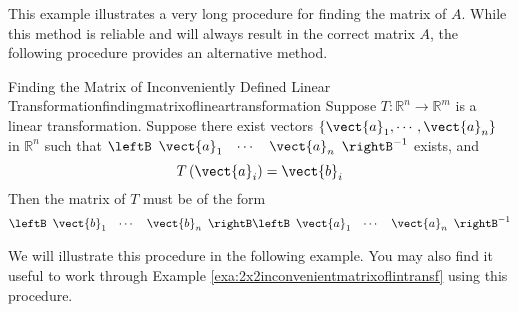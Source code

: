 This example illustrates a very long procedure for finding the matrix of $A$. While this method is reliable and
will always result in the correct matrix $A$, the following procedure provides an alternative method. 

\begin{procedure}{Finding the Matrix of Inconveniently Defined Linear Transformation}{findingmatrixoflineartransformation}
Suppose $T:\mathbb{R}^{n}\rightarrow \mathbb{R}^{m}$ is a linear transformation. Suppose there exist vectors $\left\{ \vect{a}_{1},\cdots ,\vect{a}_{n}\right\} $ in $\mathbb
{R}^{n}$ such that $\leftB
\begin{array}{ccc}
\vect{a}_{1} & \cdots & \vect{a}_{n}
\end{array}
\rightB ^{-1}$ exists, and 
\begin{equation*}
T \left(\vect{a}_{i}\right)=\vect{b}_{i}
\end{equation*}
Then the matrix of $T$ must be of the form
\begin{equation*}
\leftB
\begin{array}{ccc}
\vect{b}_{1} & \cdots & \vect{b}_{n}
\end{array}
\rightB \leftB
\begin{array}{ccc}
\vect{a}_{1} & \cdots & \vect{a}_{n}
\end{array}
\rightB ^{-1}
\end{equation*}
\end{procedure}

We will illustrate this procedure in the following example. You may also find it useful
to work through Example \ref{exa:2x2inconvenientmatrixoflintransf} using this procedure.

